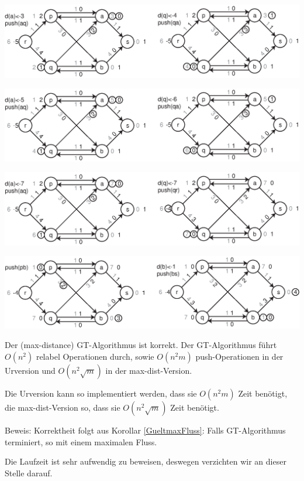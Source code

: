 \includegraphics[width=15cm]{bilder/3-0GBTarjan4}

\includegraphics[width=15cm]{bilder/3-0GBTarjan5}

\includegraphics[width=15cm]{bilder/3-0GBTarjan6}

\includegraphics[width=15cm]{bilder/3-0GBTarjan7}


\begin{satz}
Der (max-distance) GT-Algorithmus ist korrekt. Der GT-Algorithmus führt
$O(n^{2})$ relabel Operationen durch, sowie $O(n^{2}m)$ push-Operationen in
der Urversion und $O(n^{2}\sqrt{m})$ in der max-dist-Version.

Die Urversion kann so implementiert werden, dass sie $O(n^{2}m)$ Zeit
benötigt, die max-dist-Version so, dass sie $O(n^{2}\sqrt{m})$ Zeit
benötigt.
\end{satz}
Beweis: Korrektheit folgt aus Korollar \ref{GueltmaxFluss}: Falls
GT-Algorithmus terminiert, so mit einem maximalen Fluss.

Die Laufzeit ist sehr aufwendig zu beweisen, deswegen verzichten wir an
dieser Stelle darauf.

